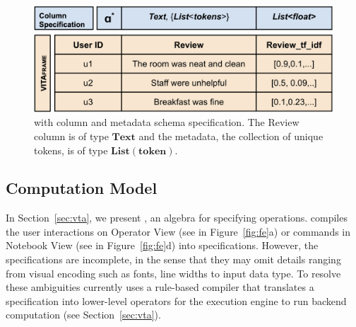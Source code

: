 \begin{figure}[!htb] 
\vspace{-10pt}
  \centering
  \includegraphics[width=\linewidth]{figures/column_spec.png}
  \caption{\small \vitaframe with column and metadata schema specification. The Review column is of type $\mathbf{Text}$ and the metadata, the collection of unique tokens, is of type $\mathbf{List}(\mathbf{token})$.\label{fig:column_spec}} 
  \vspace{-13pt}
\end{figure}

\subsection{Computation Model}\label{sec:computation}
In Section~\ref{sec:vta}, we present \vta,  an algebra for specifying \vita operations. \system compiles the user interactions on Operator View (see in Figure~\ref{fig:fe}a) or \vta commands in Notebook View (see in Figure~\ref{fig:fe}d) into \vta specifications. However, the \vta specifications are incomplete, in the sense that they may omit details ranging from visual encoding such as fonts, line widths to input data type.
To resolve these ambiguities \system currently uses a rule-based compiler that translates 
a \vta specification into lower-level operators for the execution engine to run backend computation (see Section~\ref{sec:vta}).

